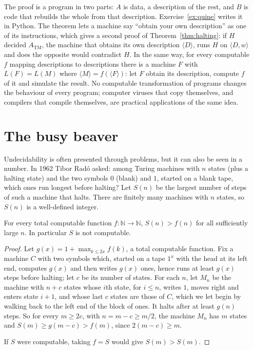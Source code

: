 The proof is a program in two parts: $A$ is data, a description of the rest, and $B$ is code that rebuilds the whole from that description. Exercise~\ref{ex:quine} writes it in Python. The theorem lets a machine say ``obtain your own description'' as one of its instructions, which gives a second proof of Theorem~\ref{thm:halting}: if $H$ decided $A_{\mathrm{TM}}$, the machine that obtains its own description $\langle D\rangle$, runs $H$ on $\langle D,w\rangle$ and does the opposite would contradict $H$. In the same way, for every computable $f$ mapping descriptions to descriptions there is a machine $F$ with $L(F)=L(M)$ where $\langle M\rangle=f(\langle F\rangle)$: let $F$ obtain its description, compute $f$ of it and simulate the result. No computable transformation of programs changes the behaviour of every program; computer viruses that copy themselves, and compilers that compile themselves, are practical applications of the same idea.

\section{The busy beaver}\label{sec:beaver}

Undecidability is often presented through problems, but it can also be seen in a number. In 1962 Tibor Radó asked: among Turing machines with $n$ states (plus a halting state) and the two symbols $0$ (blank) and $1$, started on a blank tape, which ones run longest before halting? Let $S(n)$ be the largest number of steps of such a machine that halts. There are finitely many machines with $n$ states, so $S(n)$ is a well-defined integer.

\begin{theorem}[Radó, 1962]\label{thm:beaver}
For every total computable function $f:\mathbb N\to\mathbb N$, $S(n)>f(n)$ for all sufficiently large $n$. In particular $S$ is not computable.
\end{theorem}

\begin{proof}
Let $g(x)=1+\max_{k\le2x}f(k)$, a total computable function. Fix a machine $C$ with two symbols which, started on a tape $1^x$ with the head at its left end, computes $g(x)$ and then writes $g(x)$ ones, hence runs at least $g(x)$ steps before halting; let $c$ be its number of states. For each $n$, let $M_n$ be the machine with $n+c$ states whose $i$th state, for $i\le n$, writes $1$, moves right and enters state $i+1$, and whose last $c$ states are those of $C$, which we let begin by walking back to the left end of the block of ones. It halts after at least $g(n)$ steps. So for every $m\ge2c$, with $n=m-c\ge m/2$, the machine $M_n$ has $m$ states and $S(m)\ge g(m-c)>f(m)$, since $2(m-c)\ge m$.

If $S$ were computable, taking $f=S$ would give $S(m)>S(m)$.
\end{proof}

